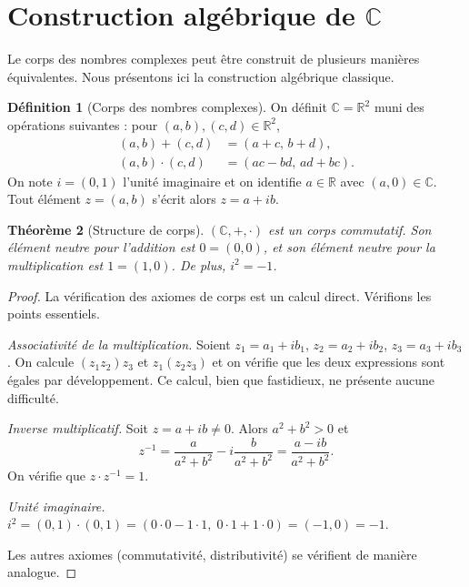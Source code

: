 \documentclass[12pt,a4paper,openany]{book}
\theoremstyle{definition}
\newtheorem{definition}{Définition}[chapter]
\theoremstyle{plain}
\newtheorem{theoreme}[definition]{Théorème}
\theoremstyle{remark}
\newcommand{\C}{\mathbb{C}}
\newcommand{\R}{\mathbb{R}}
\begin{document}
\section{Construction algébrique de \texorpdfstring{$\C$}{C}}\label{sec:construction-C}

Le corps des nombres complexes peut être construit de plusieurs manières équivalentes. Nous présentons ici la construction algébrique classique.

\begin{definition}[Corps des nombres complexes]\label{def:corps-C}
On définit $\C = \R^2$ muni des opérations suivantes : pour $(a,b), (c,d) \in \R^2$,
\begin{align}
  (a,b) + (c,d) &= (a+c,\, b+d), \label{eq:addition-C} \\
  (a,b) \cdot (c,d) &= (ac - bd,\, ad + bc). \label{eq:multiplication-C}
\end{align}
On note $i = (0,1)$ l'unité imaginaire et on identifie $a \in \R$ avec $(a,0) \in \C$. Tout élément $z = (a,b)$ s'écrit alors $z = a + ib$.
\end{definition}

\begin{theoreme}[Structure de corps]\label{thm:C-corps}
$(\C, +, \cdot)$ est un corps commutatif. Son élément neutre pour l'addition est $0 = (0,0)$, et son élément neutre pour la multiplication est $1 = (1,0)$. De plus, $i^2 = -1$.
\end{theoreme}

\begin{proof}
La vérification des axiomes de corps est un calcul direct. Vérifions les points essentiels.

\emph{Associativité de la multiplication.} Soient $z_1 = a_1 + ib_1$, $z_2 = a_2 + ib_2$, $z_3 = a_3 + ib_3$. On calcule $(z_1 z_2)z_3$ et $z_1(z_2 z_3)$ et on vérifie que les deux expressions sont égales par développement. Ce calcul, bien que fastidieux, ne présente aucune difficulté.

\emph{Inverse multiplicatif.} Soit $z = a + ib \neq 0$. Alors $a^2 + b^2 > 0$ et
\[
  z^{-1} = \frac{a}{a^2 + b^2} - i\frac{b}{a^2 + b^2} = \frac{a - ib}{a^2 + b^2}.
\]
On vérifie que $z \cdot z^{-1} = 1$.

\emph{Unité imaginaire.} $i^2 = (0,1) \cdot (0,1) = (0\cdot 0 - 1\cdot 1,\; 0\cdot 1 + 1\cdot 0) = (-1,0) = -1$.

Les autres axiomes (commutativité, distributivité) se vérifient de manière analogue.
\end{proof}
\end{document}
